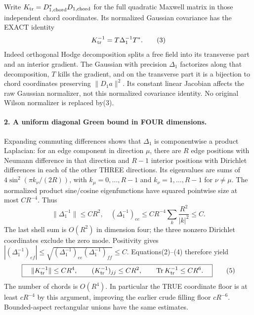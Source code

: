 \documentclass[11pt]{article}
\begin{document}
Write $K_{\rm tr}=D_{1,\rm chord}^*D_{1,\rm chord}$ for the full quadratic
Maxwell matrix in those independent chord coordinates. Its normalized
Gaussian covariance has the EXACT identity
\[
 K_{\rm tr}^{-1}=T\Delta_1^{-1}T^*.                                    \tag{3}
\]
Indeed orthogonal Hodge decomposition splits a free field into its transverse
part and an interior gradient. The Gaussian with precision $\Delta_1$
factorizes along that decomposition, $T$ kills the gradient, and on the
transverse part it is a bijection to chord coordinates preserving
$\|D_1a\|^2$. Its constant linear Jacobian affects the raw Gaussian normalizer,
not this normalized covariance identity. No original Wilson normalizer is
replaced by(3).

\paragraph{2. A uniform diagonal Green bound in FOUR dimensions.}
Expanding commuting differences shows that $\Delta_1$ is componentwise a
product Laplacian: for an edge component in direction $\mu$, there are $R$
edge positions with Neumann difference in that direction and $R-1$ interior
positions with Dirichlet differences in each of the other THREE directions.
Its eigenvalues are sums of
$4\sin^2(\pi k_\nu/(2R))$, with $k_\mu=0,\ldots,R-1$ and
$k_\nu=1,\ldots,R-1$ for $\nu\ne\mu$.
The normalized product sine/cosine eigenfunctions have squared pointwise size
at most $CR^{-4}$. Thus
\[
 \|\Delta_1^{-1}\|\le CR^2,
\quad (\Delta_1^{-1})_{ee}
 \le CR^{-4}\sum_k\frac{R^2}{|k|^2}\le C.                              \tag{4}
\]
The last shell sum is $O(R^2)$ in dimension four; the three nonzero Dirichlet
coordinates exclude the zero mode. Positivity gives
$|(\Delta_1^{-1})_{ef}|\le
\sqrt{(\Delta_1^{-1})_{ee}(\Delta_1^{-1})_{ff}}\le C$.
Equations(2)--(4) therefore yield
\[
 \boxed{\quad\|K_{\rm tr}^{-1}\|\le CR^4,\qquad
        (K_{\rm tr}^{-1})_{jj}\le CR^2,\qquad
        \operatorname{Tr}K_{\rm tr}^{-1}\le CR^6.\quad}                 \tag{5}
\]
The number of chords is $O(R^4)$. In particular the TRUE coordinate floor is
at least $cR^{-4}$ by this argument, improving the earlier crude filling floor
$cR^{-6}$. Bounded-aspect rectangular unions have the same estimates.
\end{document}
